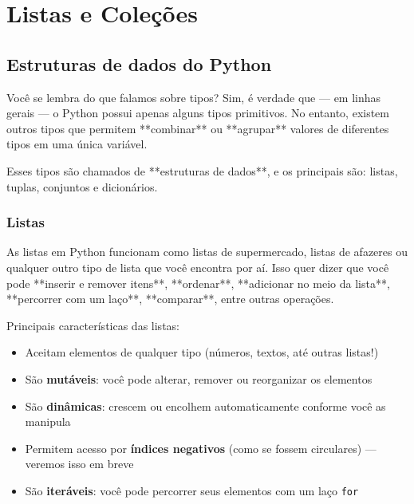 \documentclass[12pt]{book}
\begin{document}
	\chapter{Listas e Coleções}
	
	
	\section{Estruturas de dados do Python}
	
	Você se lembra do que falamos sobre tipos?  
	Sim, é verdade que — em linhas gerais — o Python possui apenas alguns tipos primitivos. No entanto, existem outros tipos que permitem **combinar** ou **agrupar** valores de diferentes tipos em uma única variável.
	
	Esses tipos são chamados de **estruturas de dados**, e os principais são: listas, tuplas, conjuntos e dicionários.
	
\subsection{Listas}

As listas em Python funcionam como listas de supermercado, listas de afazeres ou qualquer outro tipo de lista que você encontra por aí.  
Isso quer dizer que você pode **inserir e remover itens**, **ordenar**, **adicionar no meio da lista**, **percorrer com um laço**, **comparar**, entre outras operações.

Principais características das listas:

\begin{itemize}
	\item Aceitam elementos de qualquer tipo (números, textos, até outras listas!)
	\item São \textbf{mutáveis}: você pode alterar, remover ou reorganizar os elementos
	\item São \textbf{dinâmicas}: crescem ou encolhem automaticamente conforme você as manipula
	\item Permitem acesso por \textbf{índices negativos} (como se fossem circulares) — veremos isso em breve
	\item São \textbf{iteráveis}: você pode percorrer seus elementos com um laço \texttt{for}
\end{itemize}
\end{document}
